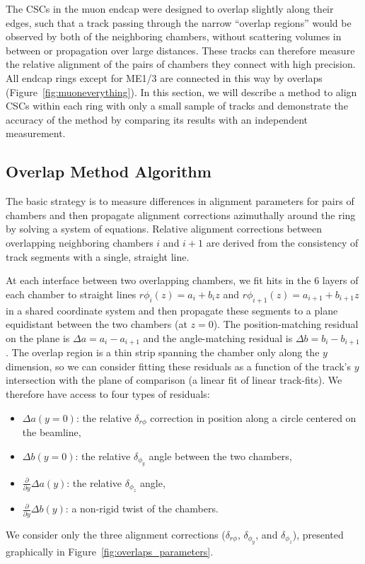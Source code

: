 The CSCs in the muon endcap were designed to overlap slightly along
their edges, such that a track passing through the narrow ``overlap
regions'' would be observed by both of the neighboring chambers,
without scattering volumes in between or propagation over large
distances.  These tracks can therefore measure the relative alignment
of the pairs of chambers they connect with high precision.  All endcap
rings except for ME1/3 are connected in this way by overlaps
(Figure~\ref{fig:muoneverything}).  In this section, we will describe
a method to align CSCs within each ring with only a small sample of
tracks and demonstrate the accuracy of the method by comparing its
results with an independent measurement.

\subsection{Overlap Method Algorithm} 

The basic strategy is to measure differences in alignment parameters
for pairs of chambers and then propagate alignment corrections azimuthally around
the ring by solving a system of equations.  Relative alignment
corrections between overlapping neighboring chambers $i$ and $i+1$ are derived
from the consistency of track segments with a single, straight line.

At each interface between two overlapping chambers, we fit hits in the 6 layers of
each chamber to straight lines $r\phi_i(z) = a_i + b_i z$ and
$r\phi_{i+1}(z) = a_{i+1} + b_{i+1} z$ in a shared coordinate system
and then propagate these segments to a plane equidistant between the
two chambers (at $z=0$).  The position-matching residual on the
plane is $\Delta a = a_i - a_{i+1}$ and the angle-matching residual
is $\Delta b = b_i - b_{i+1}$.  The overlap region is a thin strip
spanning the chamber only along the $y$ dimension, so we can consider
fitting these residuals as a function of the track's $y$ intersection
with the plane of comparison (a linear fit of linear track-fits).
We therefore have access to four types of residuals:
\begin{itemize}
\item $\Delta a(y=0)$: the relative $\delta_{r\phi}$
correction in position along a circle centered on the beamline,
\item $\Delta b(y=0)$: the relative $\delta_{\phi_y}$
angle between the two chambers,
\item $\frac{\partial}{\partial y} \Delta a(y)$: the relative $\delta_{\phi_z}$ angle,
\item $\frac{\partial}{\partial y} \Delta b(y)$: a non-rigid twist of the chambers.
\end{itemize}
We consider only the three alignment corrections ($\delta_{r\phi}$,
$\delta_{\phi_y}$, and $\delta_{\phi_z}$), presented graphically in
Figure~\ref{fig:overlaps_parameters}.

